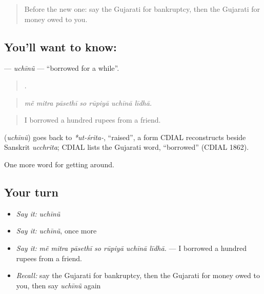 \label{lesson:GU-C428-uchinu}



\begin{quote}
Before the new one: say the Gujarati for bankruptcy, then the Gujarati for money owed to you.
\end{quote}

\subsection*{You'll want to know: }
\textbf{} — \emph{uchīnũ} — \textquotedblleft{}borrowed for a while\textquotedblright{}.

\begin{quote}
      .
\end{quote}

\begin{quote}
\emph{mẽ mitra pāsethī so rūpiyā uchīnā līdhā.}
\end{quote}

\begin{quote}
I borrowed a hundred rupees from a friend.
\end{quote}

\begin{cousinweb}
\textbf{} (\emph{uchīnũ}) goes back to \emph{*ut-śrita-}, \textquotedblleft{}raised\textquotedblright{}, a form CDIAL reconstructs beside Sanskrit \emph{ucchrita}; CDIAL lists the Gujarati word, \textquotedblleft{}borrowed\textquotedblright{} (CDIAL 1862).
\end{cousinweb}

\begin{grammarlens}[title={What you've built}]
One more word for getting around.
\end{grammarlens}

\subsection*{Your turn}
\begin{itemize}
\raggedright
  \item \emph{Say it:} \emph{uchīnũ}
  \item \emph{Say it:} \emph{uchīnũ}, once more
  \item \emph{Say it:} \emph{mẽ mitra pāsethī so rūpiyā uchīnā līdhā.} — I borrowed a hundred rupees from a friend.
  \item \emph{Recall:} say the Gujarati for bankruptcy, then the Gujarati for money owed to you, then say \emph{uchīnũ} again
\end{itemize}

